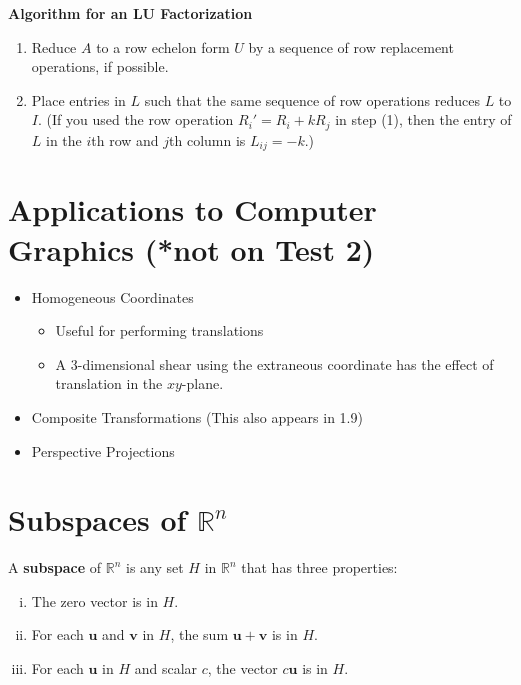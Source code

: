 \documentclass[10pt]{book}
\newenvironment{boxthm}{\begin{mdframed}[backgroundcolor=gray!30,nobreak=true]}{\end{mdframed}}
\newenvironment{boxdef}{\begin{mdframed}[backgroundcolor=gray!30,linewidth=0pt,nobreak=true]}{\end{mdframed}}
\newcommand{\vect}[1]{\ensuremath{\boldsymbol{\mathbf{#1}}}}
\begin{document}
\begin{boxthm}
	\textbf{Algorithm for an LU Factorization}
		\begin{enumerate}[(1)]
		\item Reduce $A$ to a row echelon form $U$ by a sequence of row replacement operations, if possible. 
		\item Place entries in $L$ such that the same sequence of row operations reduces $L$ to $I$. (If you used the row operation $R_i'=R_i+kR_j$ in step (1), then the entry of $L$ in the $i$th row and $j$th column is $L_{ij}=-k$.)
	\end{enumerate}
\end{boxthm}


\setcounter{section}{6}
\section{Applications to Computer Graphics (*not on Test 2)}

\begin{itemize}
	\item Homogeneous Coordinates
		\begin{itemize}
			\item Useful for performing translations
			\item A 3-dimensional shear using the extraneous coordinate has the effect of translation in the $xy$-plane.
		\end{itemize}
	\item Composite Transformations (This also appears in 1.9)
	\item Perspective Projections
\end{itemize}

\section{Subspaces of $\mathbb{R}^n$}
\begin{boxdef}
A {\bf subspace} of $\mathbb{R}^n$ is any set $H$ in $\mathbb{R}^n$ that has three properties:
\begin{enumerate}[(i)]
	\item The zero vector is in $H$.
	\item For each $\vect{u}$ and $\vect{v}$ in $H$, the sum $\vect{u}+\vect{v}$ is in $H$.
	\item For each $\vect{u}$ in $H$ and scalar $c$, the vector $c\vect{u}$ is in $H$.
\end{enumerate}
\end{boxdef}
\end{document}
